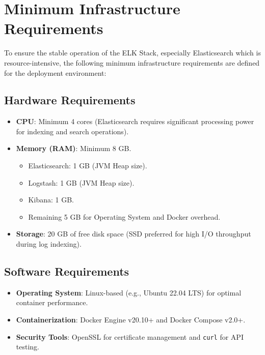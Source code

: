 \documentclass[12pt,a4paper]{report}
\begin{document}
\section{Minimum Infrastructure Requirements}

To ensure the stable operation of the ELK Stack, especially Elasticsearch which is resource-intensive, the following minimum infrastructure requirements are defined for the deployment environment:

\subsection{Hardware Requirements}

\begin{itemize}[leftmargin=1.5em]
    \item \textbf{CPU}: Minimum 4 cores (Elasticsearch requires significant processing power for indexing and search operations).
    \item \textbf{Memory (RAM)}: Minimum 8 GB.
        \begin{itemize}
            \item Elasticsearch: 1 GB (JVM Heap size).
            \item Logstash: 1 GB (JVM Heap size).
            \item Kibana: 1 GB.
            \item Remaining 5 GB for Operating System and Docker overhead.
        \end{itemize}
    \item \textbf{Storage}: 20 GB of free disk space (SSD preferred for high I/O throughput during log indexing).
\end{itemize}

\subsection{Software Requirements}

\begin{itemize}[leftmargin=1.5em]
    \item \textbf{Operating System}: Linux-based (e.g., Ubuntu 22.04 LTS) for optimal container performance.
    \item \textbf{Containerization}: Docker Engine v20.10+ and Docker Compose v2.0+.
    \item \textbf{Security Tools}: OpenSSL for certificate management and \texttt{curl} for API testing.
\end{itemize}
\end{document}
